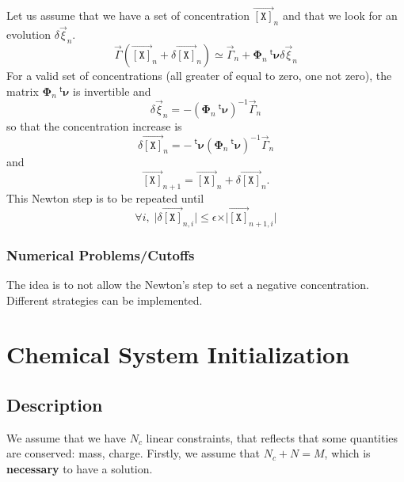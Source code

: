 \documentclass[aps,twocolumn]{revtex4}
\newcommand{\myconc}[1]{\left\lbrack #1 \right\rbrack}
\newcommand{\mychem}[1]{{\mathtt{#1}}}
\newcommand{\mymat}[1]{\boldsymbol{#1}}
\newcommand{\mytrn}[1]{{\!\!~^{\mathsf{t}}{#1}}}
\newcommand{\myvec}[1]{\overrightarrow{#1}}
\newcommand{\vecX}{\myvec{\myconc{\mychem{X}}}}
\begin{document}
Let us assume that we have a set of concentration $\vecX_{n}$ and that we look for an evolution $\delta\vec{\xi}_{n}$.
\begin{equation}
	\vec{\Gamma}\left(\vecX_{n}+\delta\vecX_{n}\right) \simeq \vec{\Gamma}_{n} + \mymat{\Phi}_n \mytrn{\mymat{\nu}} \delta\vec{\xi}_n
\end{equation}
For a valid set of concentrations (all greater of equal to zero, one not zero), the matrix $\mymat{\Phi}_n \mytrn{\mymat{\nu}}$ is invertible
and
\begin{equation}
	\delta\vec{\xi}_n = -\left(\mymat{\Phi}_n \mytrn{\mymat{\nu}}\right)^{-1} \vec{\Gamma}_{n}
\end{equation}
so that the concentration increase is
\begin{equation}
	\delta\vecX_{n} = - \mytrn{\mymat{\nu}}\left(\mymat{\Phi}_n \mytrn{\mymat{\nu}}\right)^{-1} \vec{\Gamma}_{n}
\end{equation}
and
\begin{equation}
	\vecX_{n+1} = \vecX_{n} + \delta\vecX_{n}.
\end{equation}
This Newton step is to be repeated until
\begin{equation}
	\forall i, \; \vert\delta\vecX_{n,i}\vert \leq \epsilon \times \vert\vecX_{n+1,i}\vert
\end{equation}

\subsubsection{Numerical Problems/Cutoffs}
The idea is to not allow the Newton's step to set a negative concentration.
Different strategies can be implemented.



\section{Chemical System Initialization}
\subsection{Description}
We assume that we have $N_c$ linear constraints, that reflects that some quantities are conserved: mass, charge.
Firstly, we assume that $N_c+N=M$, which is \textbf{necessary} to have a solution.
\end{document}
